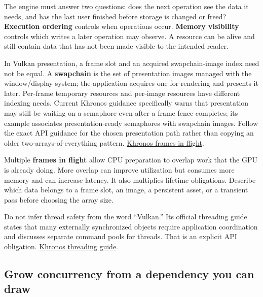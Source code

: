 The engine must answer two questions: does the next operation see the data it needs, and has the last user finished before storage is changed or freed? \textbf{Execution ordering} controls when operations occur. \textbf{Memory visibility} controls which writes a later operation may observe. A resource can be alive and still contain data that has not been made visible to the intended reader.

In Vulkan presentation, a frame slot and an acquired swapchain-image index need not be equal. A \textbf{swapchain} is the set of presentation images managed with the window/display system; the application acquires one for rendering and presents it later. Per-frame temporary resources and per-image resources have different indexing needs. Current Khronos guidance specifically warns that presentation may still be waiting on a semaphore even after a frame fence completes; its example associates presentation-ready semaphores with swapchain images. Follow the exact API guidance for the chosen presentation path rather than copying an older two-arrays-of-everything pattern. \href{https://docs.vulkan.org/tutorial/latest/03_Drawing_a_triangle/03_Drawing/03_Frames_in_flight.html}{Khronos frames in flight}.


Multiple \textbf{frames in flight} allow CPU preparation to overlap work that the GPU is already doing. More overlap can improve utilization but consumes more memory and can increase latency. It also multiplies lifetime obligations. Describe which data belongs to a frame slot, an image, a persistent asset, or a transient pass before choosing the array size.

Do not infer thread safety from the word ``Vulkan.'' Its official threading guide states that many externally synchronized objects require application coordination and discusses separate command pools for threads. That is an explicit API obligation. \href{https://docs.vulkan.org/guide/latest/threading.html}{Khronos threading guide}.

\subsection{Grow concurrency from a dependency you can draw}\label{06-engine-ii-ch026-grow-concurrency-from-a-dependency-you-can-draw}

\hypertarget{06-engine-ii-ch026-grow-concurrency-from-a-dependency-you-can-draw}{}

